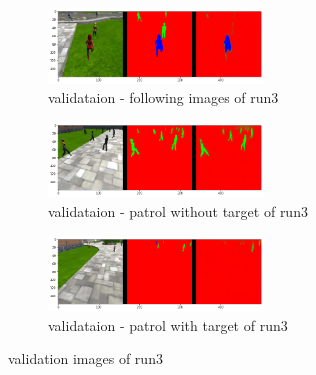 \documentclass[paper=a4, fontsize=11pt]{scrartcl} %
\numberwithin{equation}{section} %
\numberwithin{figure}{section} %
\numberwithin{table}{section} %
\begin{document}
\begin{figure}[ht]
	\begin{subfigure}{0.33\textwidth}
	\includegraphics[width=0.9\linewidth, height=2cm]{./imgs/following_images3_1.png} 
	\caption{validataion - following images of run3}
	\label{fig:subfollowing_images31}
	\end{subfigure}
	\begin{subfigure}{0.33\textwidth}
	\includegraphics[width=0.9\linewidth, height=2cm]{./imgs/patrol_non_targ3_1.png}
	\caption{validataion - patrol without target of run3}
	\label{fig:subpatrol_non_targ31}
	\end{subfigure}
	\begin{subfigure}{0.33\textwidth}
	\includegraphics[width=0.9\linewidth, height=2cm]{./imgs/patrol_with_targ3_1.png}
	\caption{validataion - patrol with target of run3}
	\label{fig:subpatrol_with_targ31}
	\end{subfigure}

	\caption{validation images of run3}
	\label{fig:outputimages31}
\end{figure}
\end{document}
